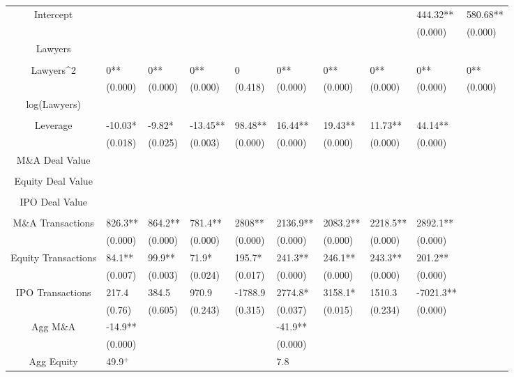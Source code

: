 \documentclass{article}
\begin{document}
\begin{table}[H]
\begin{tabular}{|clllllllll|}
Intercept &  &  &  &  &  &  &  & 444.32** & 580.68** \\ 
   &  &  &  &  &  &  &  & (0.000) & (0.000) \\ 
  Lawyers &  &  &  &  &  &  &  &  &  \\ 
   &  &  &  &  &  &  &  &  &  \\ 
  Lawyers^2 & 0** & 0** & 0** & 0 & 0** & 0** & 0** & 0** & 0** \\ 
   & (0.000) & (0.000) & (0.000) & (0.418) & (0.000) & (0.000) & (0.000) & (0.000) & (0.000) \\ 
  log(Lawyers) &  &  &  &  &  &  &  &  &  \\ 
   &  &  &  &  &  &  &  &  &  \\ 
  Leverage & -10.03* & -9.82* & -13.45** & 98.48** & 16.44** & 19.43** & 11.73** & 44.14** &  \\ 
   & (0.018) & (0.025) & (0.003) & (0.000) & (0.000) & (0.000) & (0.000) & (0.000) &  \\ 
  M\&A Deal Value &  &  &  &  &  &  &  &  &  \\ 
   &  &  &  &  &  &  &  &  &  \\ 
  Equity Deal Value &  &  &  &  &  &  &  &  &  \\ 
   &  &  &  &  &  &  &  &  &  \\ 
  IPO Deal Value &  &  &  &  &  &  &  &  &  \\ 
   &  &  &  &  &  &  &  &  &  \\ 
  M\&A Transactions & 826.3** & 864.2** & 781.4** & 2808** & 2136.9** & 2083.2** & 2218.5** & 2892.1** &  \\ 
   & (0.000) & (0.000) & (0.000) & (0.000) & (0.000) & (0.000) & (0.000) & (0.000) &  \\ 
  Equity Transactions & 84.1** & 99.9** & 71.9* & 195.7* & 241.3** & 246.1** & 243.3** & 201.2** &  \\ 
   & (0.007) & (0.003) & (0.024) & (0.017) & (0.000) & (0.000) & (0.000) & (0.000) &  \\ 
  IPO Transactions & 217.4 & 384.5 & 970.9 & -1788.9 & 2774.8* & 3158.1* & 1510.3 & -7021.3** &  \\ 
   & (0.76) & (0.605) & (0.243) & (0.315) & (0.037) & (0.015) & (0.234) & (0.000) &  \\ 
  Agg M\&A & -14.9** &  &  &  & -41.9** &  &  &  &  \\ 
   & (0.000) &  &  &  & (0.000) &  &  &  &  \\ 
  Agg Equity & 49.9$^{+}$ &  &  &  & 7.8 &  &  &  &  \\ 

\end{tabular}
\end{table}
\end{document}
